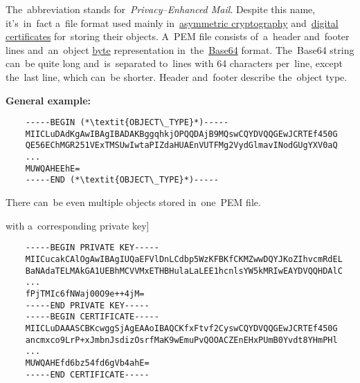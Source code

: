 \label{pem}
The~abbreviation stands for~\textit{Privacy--Enhanced Mail}.
Despite this name, it's~in~fact a~file format used mainly in~\hyperref[asymmetriccryptography]{asymmetric cryptography} and~\hyperref[certificate]{digital certificates} for~storing their objects.
A~PEM file consists of~a~header and~footer lines and~an~object \hyperref[bitsbytes]{byte} representation in~the~\hyperref[base64]{Base64} format.
The~Base64 string can~be quite long and~is~separated to~lines with 64 characters per~line, except the~last line, which can~be shorter.
Header and~footer describe the~object type.
\newline

\noindent \textbf{General example:}
\begin{lstlisting}
    -----BEGIN (*\textit{OBJECT\_TYPE}*)-----
    MIICLuDAdKgAwIBAgIBADAKBggqhkjOPQQDAjB9MQswCQYDVQQGEwJCRTEf450G
    QE56EChMGR251VExTMSUwIwtaPIZdaHUAEnVUTFMg2VydGlmavINodGUgYXV0aQ
    ...
    MUWQAHEEhE=
    -----END (*\textit{OBJECT\_TYPE}*)-----
\end{lstlisting}
\newline

\noindent There can~be even multiple objects stored in~one~PEM file.

\example[\hyperref[certificate]{certificate} with a~corresponding private key]
\begin{lstlisting}
    -----BEGIN PRIVATE KEY-----
    MIICucakCAlOgAwIBAgIUQaEFVlDnLCdbp5WzKFBKfCKMZwwDQYJKoZIhvcmRdEL
    BaNAdaTELMAkGA1UEBhMCVVMxETHBHulaLaLEE1hcnlsYW5kMRIwEAYDVQQHDAlC
    ...
    fPjTMIc6fNWaj00O9e++4jM=
    -----END PRIVATE KEY-----
    -----BEGIN CERTIFICATE-----
    MIICLuDAAASCBKcwggSjAgEAAoIBAQCKfxFtvf2CyswCQYDVQQGEwJCRTEf450G
    ancmxco9LrP+xJmbnJsdizOsrfMaK9wEmuPvQOOACZEnEHxPUmB0Yvdt8YHmPHl
    ...
    MUWQAHEfd6bz54fd6gVb4ahE=
    -----END CERTIFICATE-----
\end{lstlisting}
